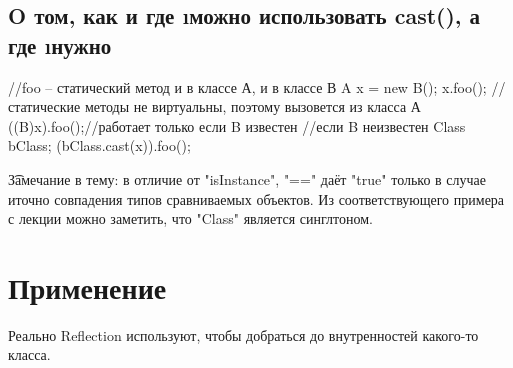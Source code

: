 \subsection{O том, как и где \i{можно} использовать cast(), а где \i{нужно}}
\begin{javacode}

//foo -- статический метод и в классе А, и в классе В
A x = new B();
x.foo(); //статические методы не виртуальны, поэтому вызовется из класса А
((B)x).foo();//работает только если B известен
//если B неизвестен
Class bClass;
(bClass.cast(x)).foo();
\end{javacode}

\t{Замечание в тему:} в отличие от \java"isInstance", \java"==" даёт \java"true" только в случае иточно совпадения типов сравниваемых объектов. 
Из соответствующего примера с лекции можно заметить, что \java"Class" является синглтоном.

\section{Применение}
Реально Reflection используют, чтобы добраться до внутренностей какого-то класса.

